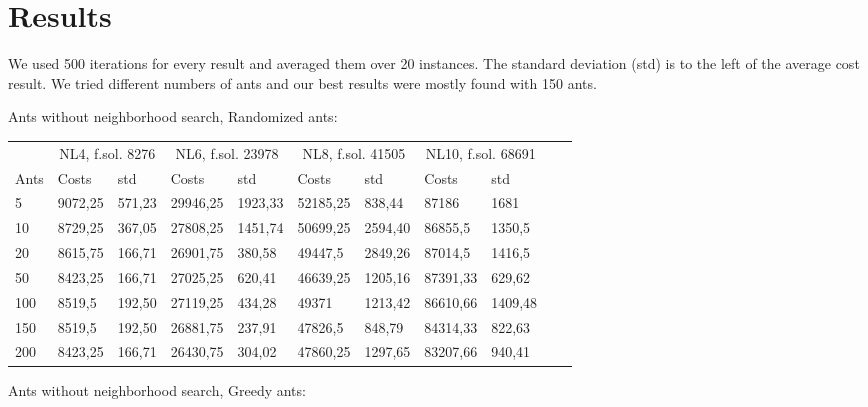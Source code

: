 \section{Results}

We used 500 iterations for every result and averaged them over 20 instances. The
standard deviation (std) is to the left of the average cost result. We tried
different numbers of ants and our best results were mostly found with 150 ants.

Ants without neighborhood search, Randomized ants:
\newline
\begin{minipage}[b]{1.0\textwidth}
    \begin{tabular}{ l | ll | ll | ll | ll | ll}
	\hline
	& \multicolumn{2}{c}{NL4, f.sol. 8276} & \multicolumn{2}{c}{NL6, f.sol. 23978}
	& \multicolumn{2}{c}{NL8, f.sol. 41505} & \multicolumn{2}{c}{NL10, f.sol. 68691} \\
	\cline{1-9}
	Ants & Costs & std & Costs & std & Costs & std & Costs & std \\
	\hline
	5     &  9072,25    & 571,23 &  29946,25    & 1923,33 &  52185,25   & 838,44 &  87186    & 1681 \\
	10    &  8729,25    & 367,05 &  27808,25    & 1451,74 &  50699,25   & 2594,40 &  86855,5    & 1350,5 \\
	20    &  8615,75    & 166,71 &  26901,75    & 380,58 &  49447,5    & 2849,26 &  87014,5    & 1416,5 \\
	50    &  8423,25    & 166,71 &  27025,25    & 620,41 &  46639,25   & 1205,16 &  87391,33    & 629,62 \\
	100   &  8519,5    & 192,50 &  27119,25    & 434,28 &  49371      & 1213,42 &  86610,66    & 1409,48 \\
	150   &  8519,5    & 192,50 &  26881,75    & 237,91 &  47826,5    & 848,79 &  84314,33    & 822,63 \\
	200   &  8423,25    & 166,71 &  26430,75    & 304,02 &  47860,25   & 1297,65 &  83207,66    & 940,41 \\
	\hline
	\end{tabular}
\end{minipage}
\newline
Ants without neighborhood search, Greedy ants:
\newline
